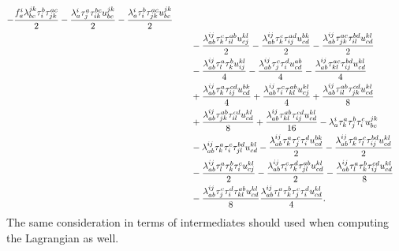 \begin{align}
            - \frac{f^{i}_{a} \lambda^{jk}_{bc} \tau^{b}_{i} \tau^{ac}_{jk}}{2}
            - \frac{\lambda^{i}_{a} \tau^{a}_{j} \tau^{bc}_{ik} u^{jk}_{bc}}{2}
            - \frac{\lambda^{i}_{a} \tau^{b}_{i} \tau^{ac}_{jk} u^{jk}_{bc}}{2}
            \nonumber \\
            &\qquad
            - \frac{\lambda^{ij}_{ab} \tau^{c}_{k} \tau^{ab}_{il} u^{kl}_{cj}}{2}
            - \frac{\lambda^{ij}_{ab} \tau^{c}_{k} \tau^{ad}_{ij} u^{bk}_{cd}}{2}
            - \frac{\lambda^{ij}_{ab} \tau^{ac}_{jk} \tau^{bd}_{il} u^{kl}_{cd}}{2}
            \nonumber \\
            &\qquad
            - \frac{\lambda^{ij}_{ab} \tau^{a}_{l} \tau^{b}_{k} u^{kl}_{ij}}{4}
            - \frac{\lambda^{ij}_{ab} \tau^{c}_{j} \tau^{d}_{i} u^{ab}_{cd}}{4}
            - \frac{\lambda^{ij}_{ab} \tau^{ac}_{kl} \tau^{bd}_{ij} u^{kl}_{cd}}{4}
            \nonumber \\
            &\qquad
            + \frac{\lambda^{ij}_{ab} \tau^{a}_{k} \tau^{cd}_{ij} u^{bk}_{cd}}{4}
            + \frac{\lambda^{ij}_{ab} \tau^{c}_{i} \tau^{ab}_{kl} u^{kl}_{cj}}{4}
            + \frac{\lambda^{ij}_{ab} \tau^{ab}_{il} \tau^{cd}_{jk} u^{kl}_{cd}}{8}
            \nonumber \\
            &\qquad
            + \frac{\lambda^{ij}_{ab} \tau^{ab}_{jk} \tau^{cd}_{il} u^{kl}_{cd}}{8}
            + \frac{\lambda^{ij}_{ab} \tau^{ab}_{kl} \tau^{cd}_{ij} u^{kl}_{cd}}{16}
            - \lambda^{i}_{a} \tau^{a}_{k} \tau^{b}_{j} \tau^{c}_{i} u^{jk}_{bc}
            \nonumber \\
            &\qquad
            - \lambda^{ij}_{ab} \tau^{a}_{k} \tau^{c}_{i} \tau^{bd}_{jl} u^{kl}_{cd}
            - \frac{\lambda^{ij}_{ab} \tau^{a}_{k} \tau^{c}_{j} \tau^{d}_{i} u^{bk}_{cd}}{2}
            - \frac{\lambda^{ij}_{ab} \tau^{a}_{k} \tau^{c}_{l} \tau^{bd}_{ij} u^{kl}_{cd}}{2}
            \nonumber \\
            &\qquad
            - \frac{\lambda^{ij}_{ab} \tau^{a}_{l} \tau^{b}_{k} \tau^{c}_{i} u^{kl}_{cj}}{2}
            - \frac{\lambda^{ij}_{ab} \tau^{c}_{i} \tau^{d}_{k} \tau^{ab}_{jl} u^{kl}_{cd}}{2}
            - \frac{\lambda^{ij}_{ab} \tau^{a}_{l} \tau^{b}_{k} \tau^{cd}_{ij} u^{kl}_{cd}}{8}
            \nonumber \\
            &\qquad
            - \frac{\lambda^{ij}_{ab} \tau^{c}_{j} \tau^{d}_{i} \tau^{ab}_{kl} u^{kl}_{cd}}{8}
            \frac{\lambda^{ij}_{ab} \tau^{a}_{l} \tau^{b}_{k}
            \tau^{c}_{j} \tau^{d}_{i} u^{kl}_{cd}}{4}.
        \end{align}
        The same consideration in terms of intermediates should used when
        computing the Lagrangian as well.

